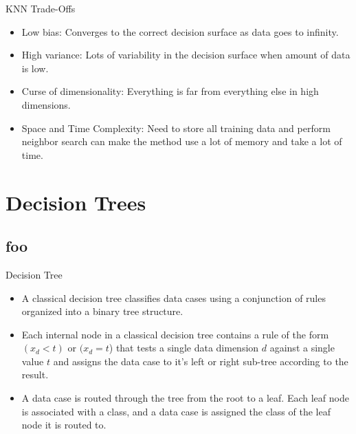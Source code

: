 \documentclass[serif,xcolor=pdftex,dvipsnames,table,hyperref={bookmarks=false}]{beamer}
\begin{document}
\begin{frame}[t]{KNN Trade-Offs}

\begin{itemize}
\item Low bias: Converges to the correct decision surface as data goes to infinity.

\pause \item High variance: Lots of variability in the decision surface when amount of data is low.

\pause \item Curse of dimensionality: Everything is far from everything else in high dimensions.

\pause \item Space and Time Complexity: Need to store all training data and perform neighbor search can make the method
use a lot of memory and take a lot of time.
\end{itemize}

\end{frame}

\section{Decision Trees}
\subsection{foo}

\begin{frame}[t]{Decision Tree}

\begin{itemize}
\item A classical decision tree classifies data cases using a conjunction of rules organized into a binary tree structure.

\pause\item Each internal node in a classical decision tree contains a rule of the form $(x_d<t)$ or $(x_d=t$) that tests a single data dimension $d$ against a single value $t$ and assigns the data case to it's left or right sub-tree according to the result.

\pause \item A data case is routed through the tree from the root to a leaf. Each leaf node is associated with a class, and a data case is assigned the class of the leaf node it is routed to.

\end{itemize}

\end{frame}
\end{document}
